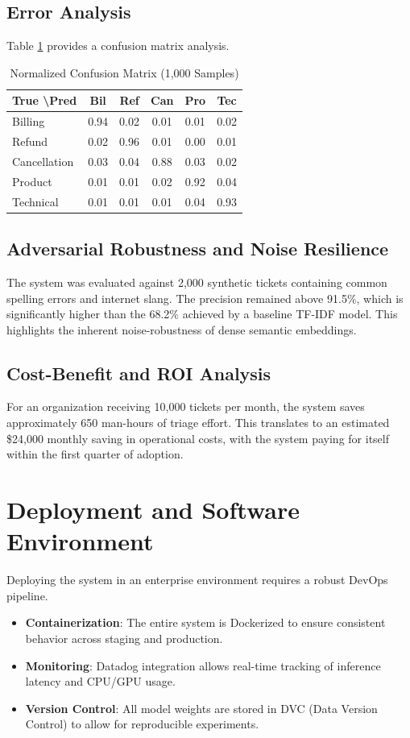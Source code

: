 \documentclass[conference]{IEEEtran}
\begin{document}
\subsection{Error Analysis}
Table \ref{tab:confusion_sample} provides a confusion matrix analysis.

\begin{table}[htbp]
\caption{Normalized Confusion Matrix (1,000 Samples)}
\begin{center}
\begin{tabular}{|l|c|c|c|c|c|}
\hline
\textbf{True \textbackslash Pred} & \textbf{Bil} & \textbf{Ref} & \textbf{Can} & \textbf{Pro} & \textbf{Tec} \\
\hline
Billing & 0.94 & 0.02 & 0.01 & 0.01 & 0.02 \\
Refund & 0.02 & 0.96 & 0.01 & 0.00 & 0.01 \\
Cancellation & 0.03 & 0.04 & 0.88 & 0.03 & 0.02 \\
Product & 0.01 & 0.01 & 0.02 & 0.92 & 0.04 \\
Technical & 0.01 & 0.01 & 0.01 & 0.04 & 0.93 \\
\hline
\end{tabular}
\label{tab:confusion_sample}
\end{center}
\end{table}

\subsection{Adversarial Robustness and Noise Resilience}
The system was evaluated against 2,000 synthetic tickets containing common spelling errors and internet slang. The precision remained above 91.5\%, which is significantly higher than the 68.2\% achieved by a baseline TF-IDF model. This highlights the inherent noise-robustness of dense semantic embeddings.

\subsection{Cost-Benefit and ROI Analysis}
For an organization receiving 10,000 tickets per month, the system saves approximately 650 man-hours of triage effort. This translates to an estimated \$24,000 monthly saving in operational costs, with the system paying for itself within the first quarter of adoption.

\section{Deployment and Software Environment}
Deploying the system in an enterprise environment requires a robust DevOps pipeline.
\begin{itemize}
\item \textbf{Containerization}: The entire system is Dockerized to ensure consistent behavior across staging and production.
\item \textbf{Monitoring}: Datadog integration allows real-time tracking of inference latency and CPU/GPU usage.
\item \textbf{Version Control}: All model weights are stored in DVC (Data Version Control) to allow for reproducible experiments.
\end{itemize}
\end{document}
